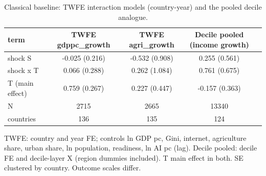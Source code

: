 \begin{table}[htbp]
\centering
\caption{Classical baseline: TWFE interaction models (country-year) and the pooled decile analogue.}
\label{tab:baseline}
\begin{tabular}{lcccc}
\toprule
term & TWFE gdppc\_growth & TWFE agri\_growth & Decile pooled (income growth) \\
\midrule
shock S & -0.025 (0.216) & -0.532 (0.908) & 0.255 (0.561) \\
shock x T & 0.066 (0.288) & 0.262 (1.084) & 0.761 (0.675) \\
T (main effect) & 0.759 (0.267) & 0.227 (0.447) & -0.157 (0.363) \\
N & 2715 & 2665 & 13340 \\
countries & 136 & 135 & 124 \\
\bottomrule
\end{tabular}
\par\smallskip\footnotesize TWFE: country and year FE; controls ln GDP pc, Gini, internet, agriculture share, urban share, ln population, readiness, ln AI pc (lag). Decile pooled: decile FE and decile-layer X (region dummies included). T main effect in both. SE clustered by country. Outcome scales differ.
\end{table}
